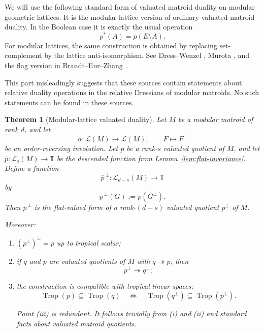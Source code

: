 \documentclass[12pt]{article}
\newcommand{\Trop}{\operatorname{Trop}}
\newcommand{\cL}{\mathcal L}
\theoremstyle{plain}
\newtheorem{theorem}{Theorem}[section]
\theoremstyle{definition}
\newcommand{\review}[1]{\begin{reviewbox}#1\end{reviewbox}}
\begin{document}
We will use the following standard form of valuated matroid duality on modular geometric lattices.  It is the modular-lattice version of ordinary valuated-matroid duality.  In the Boolean case it is exactly the usual operation
\[
   p^*(A)=p(E\setminus A).
\]
For modular lattices, the same construction is obtained by replacing set-complement by the lattice anti-isomorphism.  See Dress--Wenzel \cite{DW}, Murota \cite[Ch.~4]{Murota}, and the flag version in Brandt--Eur--Zhang \cite{BEZ}.
\review{This part misleadingly suggests that these sources contain statements about relative duality operations in the relative Dressians of modular matroids. No such statements can be found in these sources.}

\begin{theorem}[Modular-lattice valuated duality]\label{thm:modular-duality}
Let \(M\) be a modular matroid of rank \(d\), and let
\[
   \alpha:\cL(M)\longrightarrow \cL(M),\qquad F\longmapsto F^\perp
\]
be an order-reversing involution.  Let \(p\) be a rank-\(s\) valuated quotient of \(M\), and let \(\bar p:\cL_s(M)\to \mathbb T\) be the descended function from Lemma~\ref{lem:flat-invariance}.  Define a function
\[
   \bar p^{\,\perp}:\cL_{d-s}(M)\longrightarrow \mathbb T
\]
by
\[
   \bar p^{\,\perp}(G):=\bar p(G^\perp).
\]
Then \(\bar p^{\,\perp}\) is the flat-valued form of a rank-\((d-s)\) valuated quotient \(p^\perp\) of \(M\).

Moreover:
\begin{enumerate}[label=\textup{(\roman*)}]
\item \((p^\perp)^\perp=p\) up to tropical scalar;
\item if \(q\) and \(p\) are valuated quotients of \(M\) with \(q\twoheadrightarrow p\), then
\[
   p^\perp\twoheadrightarrow q^\perp;
\]
\item the construction is compatible with tropical linear spaces:
\[
   \Trop(p)\subseteq \Trop(q)
   \quad\Longleftrightarrow\quad
   \Trop(q^\perp)\subseteq \Trop(p^\perp).
\]
\review{Point (iii) is redundant. It follows trivially from (i) and (ii) and standard facts about valuated matroid quotients.}
\end{enumerate}
\end{theorem}
\end{document}
